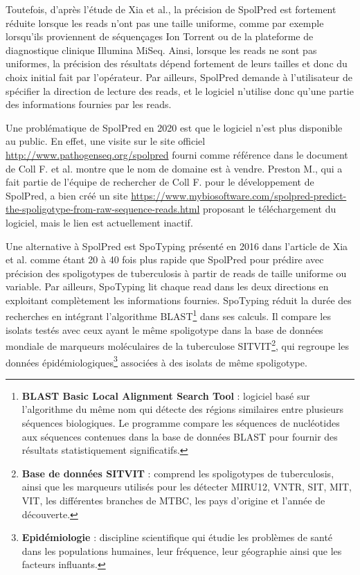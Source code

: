 \documentclass[twoside,a4paper,11pt,frenchb,openany]{report}
\begin{document}
Toutefois, d'après l'étude de Xia et al.\cite{xia}, la précision de SpolPred est fortement réduite lorsque les reads n'ont pas une taille uniforme, comme par exemple lorsqu'ils proviennent de séquençages Ion Torrent ou de la plateforme de diagnostique clinique Illumina MiSeq. Ainsi, lorsque les reads ne sont pas uniformes, la précision des résultats dépend fortement de leurs tailles et donc du choix initial fait par l'opérateur. Par ailleurs, SpolPred demande à l'utilisateur de spécifier la direction de lecture des reads, et le logiciel n'utilise donc qu'une partie des informations fournies par les reads.

Une problématique de SpolPred en 2020 est que le logiciel n'est plus disponible au public. En effet, une visite sur le site officiel \url{http://www.pathogenseq.org/spolpred} fourni comme référence dans le document \cite{coll} de Coll F. et al. montre que le nom de domaine est à vendre. Preston M., qui a fait partie de l'équipe de rechercher de Coll F. pour le développement de SpolPred, a bien créé un site \url{https://www.mybiosoftware.com/spolpred-predict-the-spoligotype-from-raw-sequence-reads.html} proposant le téléchargement du logiciel, mais le lien est actuellement inactif.

Une alternative à SpolPred est SpoTyping présenté en 2016 dans l'article \cite{xia} de Xia et al. comme étant 20 à 40 fois plus rapide que SpolPred pour prédire avec précision des spoligotypes de tuberculosis à partir de reads de taille uniforme ou variable. Par ailleurs, SpoTyping lit chaque read dans les deux directions en exploitant complètement les informations fournies. SpoTyping réduit la durée des recherches en intégrant l'algorithme BLAST\footnote{\textbf{BLAST Basic Local Alignment Search Tool} : logiciel basé sur l'algorithme du même nom qui détecte des régions similaires entre plusieurs séquences biologiques. Le programme compare les séquences de nucléotides aux séquences contenues dans la base de données BLAST pour fournir des résultats statistiquement significatifs.} dans ses calculs. Il compare les isolats testés avec ceux ayant le même spoligotype dans la base de données mondiale de marqueurs moléculaires de la tuberculose SITVIT\footnote{\textbf{Base de données SITVIT} : comprend les spoligotypes de tuberculosis, ainsi que les marqueurs utilisés pour les détecter MIRU12, VNTR, SIT, MIT, VIT, les différentes branches de MTBC, les pays d'origine et l'année de découverte.}, qui regroupe les données épidémiologiques\footnote{\textbf{Epidémiologie} : discipline scientifique qui étudie les problèmes de santé dans les populations humaines, leur fréquence, leur géographie ainsi que les facteurs influants.} associées à des isolats de même spoligotype.
\end{document}

